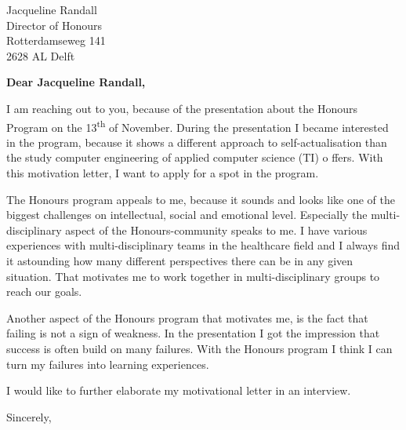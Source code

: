 \documentclass[10pt]{letter} %
\begin{document}

\begin{letter}{Jacqueline Randall \\ Director of Honours \\ Rotterdamseweg 141 \\ 2628 AL Delft} %


\opening{\textbf{Dear Jacqueline Randall,}}

I am reaching out to you, because of the presentation about the Honours Program on the 13\textsuperscript{th} of November. During the presentation I became interested in the program, because it shows a different approach to self-actualisation than the study computer engineering of applied computer science (TI) o	ffers. With this motivation letter, I want to apply for a spot in the program. 


The Honours program appeals to me, because it sounds and looks like one of the biggest challenges on intellectual, social and emotional level. Especially the multi-disciplinary aspect of the Honours-community speaks to me. I have various experiences with multi-disciplinary teams in the healthcare field and I always find it astounding how many different perspectives there can be in any given situation. That motivates me to work together in multi-disciplinary groups to reach our goals. 

Another aspect of the Honours program that motivates me, is the fact that failing is not a sign of weakness. In the presentation I got the impression that success is often build on many failures. With the Honours program I think I can turn my failures into learning experiences. 

I would like to further elaborate my motivational letter in an interview.
 

\vspace{2\parskip} %
\closing{Sincerely,}
\vspace{2\parskip} %





\end{letter}
 
\end{document}
